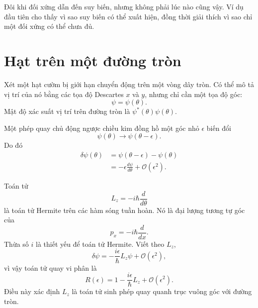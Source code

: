 Đôi khi đối xứng dẫn đến suy biến, nhưng không phải lúc nào cũng vậy. Ví dụ đầu tiên cho thấy vì sao suy biến có thể xuất hiện, đồng thời giải thích vì sao chỉ một đối xứng có thể chưa đủ.

\section{Hạt trên một đường tròn}

Xét một hạt cườm bị giới hạn chuyển động trên một vòng dây tròn. Có thể mô tả vị trí của nó bằng các tọa độ Descartes \(x\) và \(y\), nhưng chỉ cần một tọa độ góc:
\begin{equation}
\psi=\psi(\theta).
\end{equation}
Mật độ xác suất vị trí trên đường tròn là \(\psi^*(\theta)\psi(\theta)\).

Một phép quay chủ động ngược chiều kim đồng hồ một góc nhỏ \(\epsilon\) biến đổi
\begin{equation}
\psi(\theta)\longrightarrow\psi(\theta-\epsilon).
\end{equation}
Do đó
\begin{align}
\delta\psi(\theta)
&=\psi(\theta-\epsilon)-\psi(\theta)\\
&=-\epsilon\frac{d\psi}{d\theta}
+\mathcal O(\epsilon^2).
\end{align}

Toán tử
\begin{equation}
L_z=-i\hbar\frac{d}{d\theta}
\end{equation}
là toán tử Hermite trên các hàm sóng tuần hoàn. Nó là đại lượng tương tự góc của
\begin{equation}
p_x=-i\hbar\frac{d}{dx}.
\end{equation}
Thừa số \(i\) là thiết yếu để toán tử Hermite. Viết theo \(L_z\),
\begin{equation}
\delta\psi
=-\frac{i\epsilon}{\hbar}L_z\psi
+\mathcal O(\epsilon^2),
\end{equation}
vì vậy toán tử quay vi phân là
\begin{equation}
R(\epsilon)
=1-\frac{i\epsilon}{\hbar}L_z
+\mathcal O(\epsilon^2).
\end{equation}
Điều này xác định \(L_z\) là toán tử sinh phép quay quanh trục vuông góc với đường tròn.

\begin{classroomqa}
\end{classroomqa}

